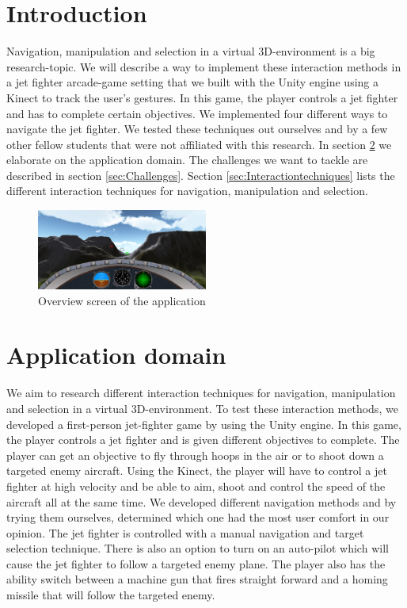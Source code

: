 \documentclass{acm_proc_article-sp}
\begin{document}

\section{Introduction}
Navigation, manipulation and selection in a virtual \newline 3D-environment is a big research-topic. We will describe a way to implement these interaction methods in a jet fighter arcade-game setting that we built with the Unity engine using a Kinect to track the user's gestures. In this game, the player controls a jet fighter and has to complete certain objectives. We implemented four different ways to navigate the jet fighter. We tested these techniques out ourselves and by a few other fellow students that were not affiliated with this research. In section \ref{sec:Applicationdomain} we elaborate on the application domain. The challenges we want to tackle are described in section \ref{sec:Challenges}. Section \ref{sec:Interactiontechniques} lists the different interaction techniques for navigation, manipulation and selection.
\begin{figure}[ht]
\centering
\includegraphics[width=0.5\textwidth ,keepaspectratio=true]{./img/overviewScreen.jpg}
\caption{Overview screen of the application}
\label{overview}
\end{figure}

\section {Application domain}\label{sec:Applicationdomain}
We aim to research different interaction techniques for navigation, manipulation and selection in a virtual 3D-environment. To test these interaction methods, we developed a first-person jet-fighter game by using the Unity engine. In this game, the player controls a jet fighter and is given different objectives to complete. The player can get an objective to fly through hoops in the air or to shoot down a targeted enemy aircraft. 
Using the Kinect, the player will have to control a jet fighter at high velocity and be able to aim, shoot and control the speed of the aircraft all at the same time.
We developed different navigation methods and by trying them ourselves, determined which one had the most user comfort in our opinion. The jet fighter is controlled with a manual navigation and target selection technique. There is also an  option to turn on an auto-pilot which will cause the jet fighter to follow a targeted enemy plane. The player also has the ability switch between a machine gun that fires straight forward and a homing missile that will follow the targeted enemy.
\end{document}
